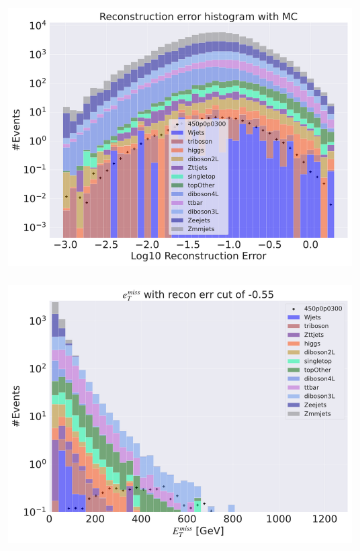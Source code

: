 \begin{figure}[H]
    \centering
    \begin{subfigure}{.49\textwidth}
        \includegraphics[width=\textwidth]{Figures/VAE_testing/big/3lep/b_data_recon_big_rm3_feats_sig_450p0p0300.pdf}
        \caption{ }
        \label{fig:VAE_3lep_big_450_3}
    \end{subfigure}
    \hfill
    \begin{subfigure}{.49\textwidth}
        \includegraphics[width=\textwidth]{Figures/VAE_testing/big/3lep/b_data_recon_big_rm3_feats_sig_450p0p0300_etmiss_recon_errcut_-0.55.pdf}
        \caption{}
        \label{fig:VAE_3lep_big_etmiss_450_3}
    \end{subfigure}

\end{figure}
